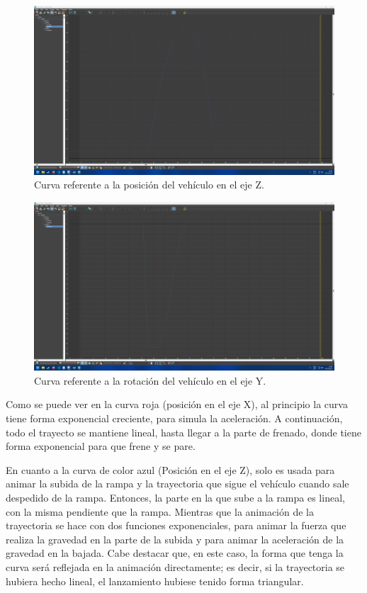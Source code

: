 \documentclass{article}
\begin{document}
 \begin{figure}[H]
    \centering
    \includegraphics[width=\textwidth]{imagenes/Ejercicio2/curvas/blue.png}
    \caption{Curva referente a la posición del vehículo en el eje Z.}
 \end{figure}
 \begin{figure}[H]
    \centering
    \includegraphics[width=\textwidth]{imagenes/Ejercicio2/curvas/green.png}
    \caption{Curva referente a la rotación del vehículo en el eje Y.}
 \end{figure}
Como se puede ver en la curva roja (posición en el eje X), al principio la curva tiene forma exponencial creciente, para simula la aceleración. A continuación, todo el trayecto se mantiene lineal, hasta llegar a la parte de frenado, donde tiene forma exponencial para que frene y se pare.

En cuanto a la curva de color azul (Posición en el eje Z), solo es usada para animar la subida de la rampa y la trayectoria que sigue el vehículo cuando sale despedido de la rampa. Entonces, la parte en la que sube a la rampa es lineal, con la misma pendiente que la rampa. Mientras que la animación de la trayectoria se hace con dos funciones exponenciales, para animar la fuerza que realiza la gravedad en la parte de la subida y para animar la aceleración de la gravedad en la bajada. Cabe destacar que, en este caso, la forma que tenga la curva será reflejada en la animación directamente; es decir, si la trayectoria se hubiera hecho lineal, el lanzamiento hubiese tenido forma triangular.
\end{document}
